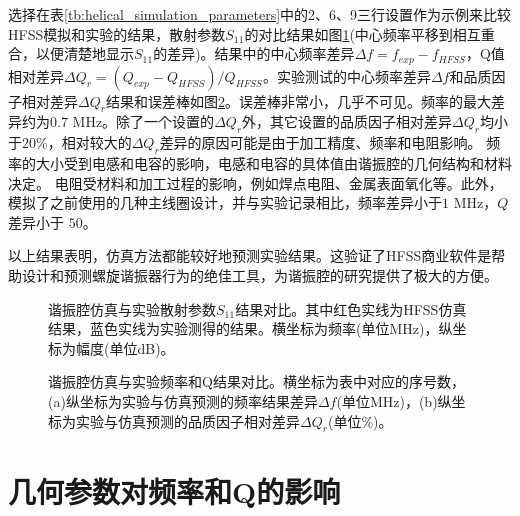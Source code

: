 选择在表\ref{tb:helical_simulation_parameters}中的2、6、9三行设置作为示例来比较HFSS模拟和实验的结果，散射参数$S_{11}$的对比结果如图\ref{fig:helical_compares}(中心频率平移到相互重合，以便清楚地显示$S_{11}$的差异)。结果中的中心频率差异$\Delta f=f_{exp}-f_{HFSS}$，Q值相对差异$\Delta Q_r=\left(Q_{exp}-Q_{HFSS}\right)/Q_{HFSS}$。实验测试的中心频率差异$\Delta f$和品质因子相对差异$\Delta Q_r$结果和误差棒如图\ref{fig:helical_compares_f_q}。误差棒非常小，几乎不可见。频率的最大差异约为$0.7$ MHz。除了一个设置的$\Delta Q_r$外，其它设置的品质因子相对差异$\Delta Q_r$均小于$20\%$，相对较大的$\Delta Q_r$差异的原因可能是由于加工精度、频率和电阻影响。
频率的大小受到电感和电容的影响，电感和电容的具体值由谐振腔的几何结构和材料决定。
电阻受材料和加工过程的影响，例如焊点电阻、金属表面氧化等。此外，模拟了之前使用的几种主线圈设计，并与实验记录相比，频率差异小于$1$ MHz，$Q$差异小于 $50$。

以上结果表明，仿真方法都能较好地预测实验结果。这验证了HFSS商业软件是帮助设计和预测螺旋谐振器行为的绝佳工具，为谐振腔的研究提供了极大的方便。

\begin{figure}
    \centering
    \caption[谐振腔仿真与实验散射参数结果对比]{谐振腔仿真与实验散射参数$S_{11}$结果对比。其中红色实线为HFSS仿真结果，蓝色实线为实验测得的结果。横坐标为频率(单位MHz)，纵坐标为幅度(单位dB)。\label{fig:helical_compares}}
\end{figure}


\begin{figure}
    \centering
    \caption[谐振腔仿真与实验频率和Q结果对比]{谐振腔仿真与实验频率和Q结果对比。横坐标为表中对应的序号数，(a)纵坐标为实验与仿真预测的频率结果差异$\Delta f$(单位MHz)，(b)纵坐标为实验与仿真预测的品质因子相对差异$\Delta Q_r$(单位\%)。\label{fig:helical_compares_f_q}}
\end{figure}

\section[几何参数对频率和Q的影响]{几何参数对频率和Q的影响}

